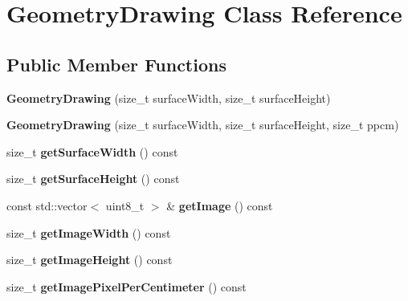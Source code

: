 \hypertarget{class_geometry_drawing}{}\section{Geometry\+Drawing Class Reference}
\label{class_geometry_drawing}
\subsection*{Public Member Functions}
\begin{DoxyCompactItemize}
\item 
\hypertarget{class_geometry_drawing_a1a08c71d3177794a958a7ecb126340e8}{}\label{class_geometry_drawing_a1a08c71d3177794a958a7ecb126340e8} 
{\bfseries Geometry\+Drawing} (size\+\_\+t surface\+Width, size\+\_\+t surface\+Height)
\item 
\hypertarget{class_geometry_drawing_af843239e1da8341f7ca12c41f352b552}{}\label{class_geometry_drawing_af843239e1da8341f7ca12c41f352b552} 
{\bfseries Geometry\+Drawing} (size\+\_\+t surface\+Width, size\+\_\+t surface\+Height, size\+\_\+t ppcm)
\item 
\hypertarget{class_geometry_drawing_af4db9b6c3390770f4a3fe875eb701bc3}{}\label{class_geometry_drawing_af4db9b6c3390770f4a3fe875eb701bc3} 
size\+\_\+t {\bfseries get\+Surface\+Width} () const
\item 
\hypertarget{class_geometry_drawing_ac0ed8b92f515482941d9190a10eea846}{}\label{class_geometry_drawing_ac0ed8b92f515482941d9190a10eea846} 
size\+\_\+t {\bfseries get\+Surface\+Height} () const
\item 
\hypertarget{class_geometry_drawing_af58655f819ad5ec2a0802c149abeb117}{}\label{class_geometry_drawing_af58655f819ad5ec2a0802c149abeb117} 
const std\+::vector$<$ uint8\+\_\+t $>$ \& {\bfseries get\+Image} () const
\item 
\hypertarget{class_geometry_drawing_aca5f8c9c51b8f5d4f4bb8e390af85ec5}{}\label{class_geometry_drawing_aca5f8c9c51b8f5d4f4bb8e390af85ec5} 
size\+\_\+t {\bfseries get\+Image\+Width} () const
\item 
\hypertarget{class_geometry_drawing_adba790904e56a380e0272cd1c5e863f6}{}\label{class_geometry_drawing_adba790904e56a380e0272cd1c5e863f6} 
size\+\_\+t {\bfseries get\+Image\+Height} () const
\item 
\hypertarget{class_geometry_drawing_a543fbeec97860242570a6b26474b71a1}{}\label{class_geometry_drawing_a543fbeec97860242570a6b26474b71a1} 
size\+\_\+t {\bfseries get\+Image\+Pixel\+Per\+Centimeter} () const

\end{DoxyCompactItemize}
